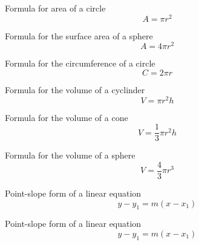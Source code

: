 \documentclass[avery5371,grid]{flashcards}
\begin{document}
\begin{flashcard}[Definition]{Formula for area of a circle}
    \begin{equation*}
        A = \pi r^2
    \end{equation*}
\end{flashcard}

\begin{flashcard}[Definition]{Formula for the surface area of a sphere}
    \begin{equation*}
        A = 4 \pi r^2
    \end{equation*}
\end{flashcard}

\begin{flashcard}[Definition]{Formula for the circumference of a circle}
    \begin{equation*}
        C = 2 \pi r
    \end{equation*}
\end{flashcard}

\begin{flashcard}[Definition]{Formula for the volume of a cyclinder}
    \begin{equation*}
        V = \pi r^2 h
    \end{equation*}
\end{flashcard}

\begin{flashcard}[Definition]{Formula for the volume of a cone}
    \begin{equation*}
        V = \frac{1}{3} \pi r^2 h
    \end{equation*}
\end{flashcard}

\begin{flashcard}[Definition]{Formula for the volume of a sphere}
    \begin{equation*}
        V = \frac{4}{3} \pi r^3
    \end{equation*}
\end{flashcard}

\begin{flashcard}[Definition]{Point-slope form of a linear equation}
    \begin{equation*}
        y - y_1 = m \left( x-x_1 \right)
    \end{equation*}
\end{flashcard}

\begin{flashcard}[Definition]{Point-slope form of a linear equation}
    \begin{equation*}
        y - y_1 = m \left( x-x_1 \right)
    \end{equation*}
\end{flashcard}
\end{document}
